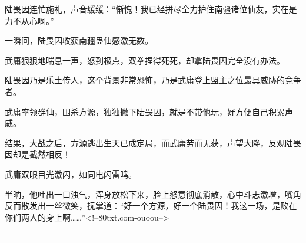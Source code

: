 \begin{this_body}
陆畏因连忙施礼，声音缓缓：“惭愧！我已经拼尽全力护住南疆诸位仙友，实在是力不从心啊。”

一瞬间，陆畏因收获南疆蛊仙感激无数。

武庸狠狠地喘息一声，怒到极点，双拳捏得死死，却拿陆畏因完全没有办法。

陆畏因乃是乐土传人，这个背景非常恐怖，乃是武庸登上盟主之位最具威胁的竞争者。

武庸率领群仙，围杀方源，独独撇下陆畏因，就是不带他玩，好方便自己积累声威。

结果，大战之后，方源逃出生天已成定局，而武庸劳而无获，声望大降，反观陆畏因却是截然相反！

武庸双眼目光激闪，如同电闪雷鸣。

半晌，他吐出一口浊气，浑身放松下来，脸上怒意彻底消散，心中斗志激增，嘴角反而散发出一丝微笑，抚掌道：“好一个方源，好一个陆畏因！我这一场，是败在你们两人的身上啊……”<!--80txt.com-ouoou-->

------------

\end{this_body}

